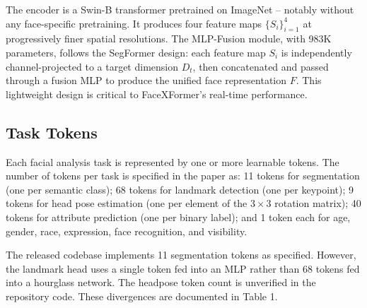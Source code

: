 \documentclass[11pt]{article}
\begin{document}
The encoder is a Swin-B transformer pretrained on ImageNet -- notably without any face-specific pretraining. It produces four feature maps $\{S_i\}_{i=1}^{4}$ at progressively finer spatial resolutions. The MLP-Fusion module, with 983K parameters, follows the SegFormer design: each feature map $S_i$ is independently channel-projected to a target dimension $D_t$, then concatenated and passed through a fusion MLP to produce the unified face representation $F$. This lightweight design is critical to FaceXFormer's real-time performance.



\subsection{Task Tokens}

Each facial analysis task is represented by one or more learnable tokens. The number of tokens per task is specified in the paper as: 11 tokens for segmentation (one per semantic class); 68 tokens for landmark detection (one per keypoint); 9 tokens for head pose estimation (one per element of the $3\times3$ rotation matrix); 40 tokens for attribute prediction (one per binary label); and 1 token each for age, gender, race, expression, face recognition, and visibility.

The released codebase implements 11 segmentation tokens as specified. However, the landmark head uses a single token fed into an MLP rather than 68 tokens fed into a hourglass network. The headpose token count is unverified in the repository code. These divergences are documented in Table 1.
\end{document}
